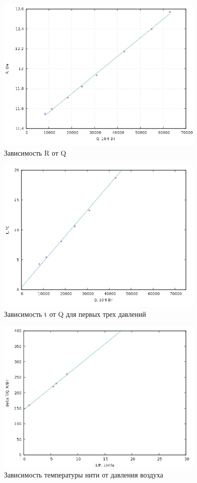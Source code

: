 \documentclass[a4paper]{article}
\begin{document}
	\begin{figure}[htb!]
		\centering
		\includegraphics[width=100mm]{plot1.png}
		\caption{Зависимость R от Q\label{overflow}}
	\end{figure}
	\begin{figure}[htb!]
		\centering
		\includegraphics[width=100mm]{plot2.png}
		\caption{Зависимость t от Q для первых трех давлений\label{overflow}}
	\end{figure}
	\begin{figure}[htb!]
		\centering
		\includegraphics[width=100mm]{plot3.png}
		\caption{Зависимость температуры нити от давления воздуха\label{overflow}}
	\end{figure}
\end{document}
